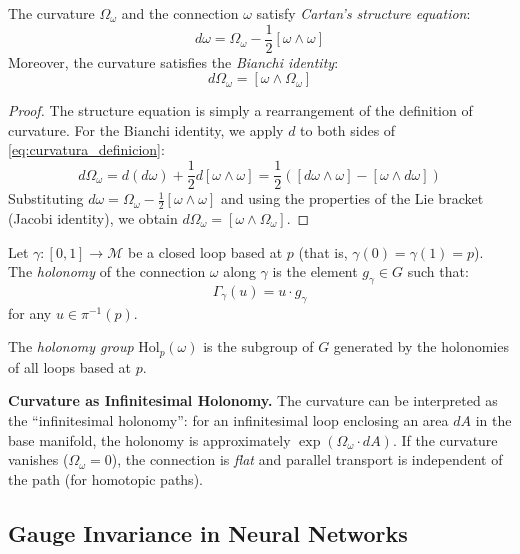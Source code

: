 \begin{theorem}\label{thm:cartan_estructura}
The curvature $\Omega_\omega$ and the connection $\omega$ satisfy \textit{Cartan's structure equation}:
\begin{equation}\label{eq:estructura_cartan}
d\omega = \Omega_\omega - \frac{1}{2}[\omega \wedge \omega]
\end{equation}
Moreover, the curvature satisfies the \textit{Bianchi identity}:
\begin{equation}\label{eq:bianchi}
d\Omega_\omega = [\omega \wedge \Omega_\omega]
\end{equation}
\end{theorem}

\begin{proof}
The structure equation is simply a rearrangement of the definition of curvature. For the Bianchi identity, we apply $d$ to both sides of \eqref{eq:curvatura_definicion}:
\[
d\Omega_\omega = d(d\omega) + \frac{1}{2}d[\omega \wedge \omega] = \frac{1}{2}([d\omega \wedge \omega] - [\omega \wedge d\omega])
\]
Substituting $d\omega = \Omega_\omega - \frac{1}{2}[\omega \wedge \omega]$ and using the properties of the Lie bracket (Jacobi identity), we obtain $d\Omega_\omega = [\omega \wedge \Omega_\omega]$.
\end{proof}

\begin{definition}[Holonomy]\label{def:holonomia}
Let $\gamma: [0,1] \to \mathcal{M}$ be a closed loop based at $p$ (that is, $\gamma(0) = \gamma(1) = p$). The \textit{holonomy} of the connection $\omega$ along $\gamma$ is the element $g_\gamma \in G$ such that:
\[
\Gamma_\gamma(u) = u \cdot g_\gamma
\]
for any $u \in \pi^{-1}(p)$.

The \textit{holonomy group} $\mathrm{Hol}_p(\omega)$ is the subgroup of $G$ generated by the holonomies of all loops based at $p$.
\end{definition}

\textbf{Curvature as Infinitesimal Holonomy.} The curvature can be interpreted as the ``infinitesimal holonomy'': for an infinitesimal loop enclosing an area $dA$ in the base manifold, the holonomy is approximately $\exp(\Omega_\omega \cdot dA)$. If the curvature vanishes ($\Omega_\omega = 0$), the connection is \textit{flat} and parallel transport is independent of the path (for homotopic paths).

\subsection{Gauge Invariance in Neural Networks}\label{subsec:invarianza_gauge_redes}

